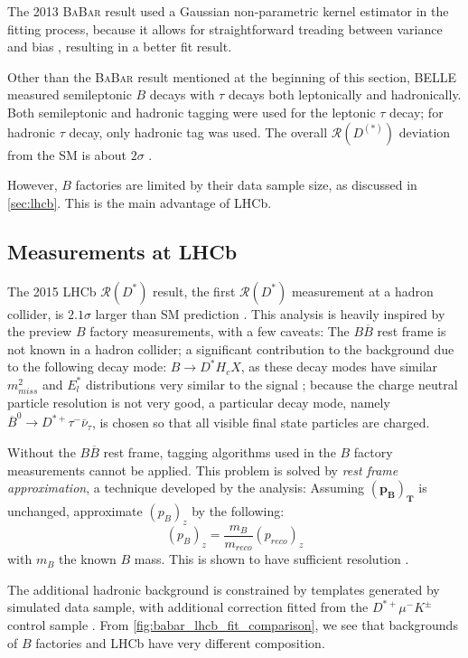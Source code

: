 \documentclass[12pt,letterpaper]{article}
\renewcommand{\vec}[1]{\mathbf{#1}}                   %
\def\BaBar/{\textsc{BaBar}}
\def\RDst/{\ensuremath{\mathcal{R}(D^{*})}}
\def\RDDst/{\ensuremath{\mathcal{R}(D^{(*)})}}
\begin{document}
The 2013 \BaBar/ result used a Gaussian non-parametric kernel estimator in the
fitting process, because it allows for straightforward treading between variance
and bias \cite{Lees:2013uzd}, resulting in a better fit result.

Other than the \BaBar/ result mentioned at the beginning of this section,
BELLE measured semileptonic $B$ decays with $\tau$ decays both
leptonically and hadronically.
Both semileptonic and hadronic tagging were used for the leptonic $\tau$ decay;
for hadronic $\tau$ decay, only hadronic tag was used.
The overall \RDDst/ deviation from the SM is about
$2\sigma$ \cite{Hirose:2017185}.

However, $B$ factories are limited by their data sample size, as discussed
in \autoref{sec:lhcb}.
This is the main advantage of LHCb.

\subsection{Measurements at LHCb} \label{sec:meas_lhcb}
The 2015 LHCb \RDst/ result, the first \RDst/ measurement at a hadron collider,
is $2.1\sigma$ larger than SM prediction \cite{LHCb:PhysRevLett.115.111803}.
This analysis is heavily inspired by the preview $B$ factory measurements, with
a few caveats:
The $B \overline{B}$ rest frame is not known in a hadron collider;
a significant contribution to the background due to the following decay mode:
$B \rightarrow D^* H_c X$, as these decay modes have similar $m^2_{miss}$ and
$E^{*}_l$ distributions very similar to the signal \cite{Ciezarek:2017yzh};
because the charge neutral particle resolution is not very good, a particular
decay mode, namely $\overline{B}^0 \rightarrow D^{*+} \tau^- \bar{\nu}_\tau$, is
chosen so that all visible final state particles are charged.

Without the $B \overline{B}$ rest frame, tagging algorithms used in the $B$
factory measurements cannot be applied.
This problem is solved by \emph{rest frame approximation}, a technique developed
by the analysis:
Assuming $\vec{(p_{B})_T}$ is unchanged, approximate $(p_{B})_z$ by the
following:
\begin{equation}
    (p_{B})_z = \frac{m_B}{m_{reco}} (p_{reco})_z
\end{equation}
with $m_B$ the known $B$ mass.
This is shown to have sufficient resolution \cite{LHCb:PhysRevLett.115.111803}.

The additional hadronic background is constrained by templates generated by
simulated data sample, with additional correction fitted from the
$D^{*+} \mu^- K^{\pm}$ control sample \cite{LHCb:PhysRevLett.115.111803}.
From \autoref{fig:babar_lhcb_fit_comparison}, we see that backgrounds of $B$
factories and LHCb have very different composition.
\end{document}
